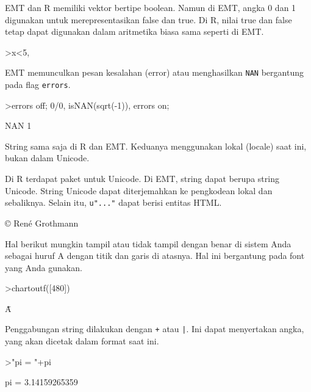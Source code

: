 \documentclass[a4paper,11pt,oneside,enabledeprecatedfontcommands]{scrbook}
\newenvironment{eulernotebook}{}{}
\newenvironment{eulercomment}{\par\medskip\noindent}{\par\medskip}
\begin{document}
\begin{eulernotebook}
\begin{eulercomment}
			EMT dan R memiliki vektor bertipe boolean. Namun di EMT, angka 0 dan 1 digunakan untuk
			merepresentasikan false dan true. Di R, nilai true dan false tetap dapat digunakan dalam aritmetika
			biasa sama seperti di EMT.
		\end{eulercomment}
		\begin{eulerprompt}
			>x<5, %
		\end{eulerprompt}
		\begin{euleroutput}
			[0,  0,  1,  0,  0]
			[0,  0,  3.1,  0,  0]
		\end{euleroutput}
		\begin{eulercomment}
			EMT memunculkan pesan kesalahan (error) atau menghasilkan \texttt{NAN} bergantung pada flag \texttt{errors}.
		\end{eulercomment}
		\begin{eulerprompt}
			>errors off; 0/0, isNAN(sqrt(-1)), errors on;
		\end{eulerprompt}
		\begin{euleroutput}
			NAN
			1
		\end{euleroutput}
		\begin{eulercomment}
			String sama saja di R dan EMT. Keduanya menggunakan lokal (locale) saat ini, bukan dalam Unicode.
			
			Di R terdapat paket untuk Unicode. Di EMT, string dapat berupa string Unicode. String Unicode dapat
			diterjemahkan ke pengkodean lokal dan sebaliknya. Selain itu, \texttt{u"..."} dapat berisi entitas HTML.
		\end{eulercomment}
		\begin{euleroutput}
			© René Grothmann
		\end{euleroutput}
		\begin{eulercomment}
			Hal berikut mungkin tampil atau tidak tampil dengan benar di sistem Anda sebagai huruf A dengan titik
			dan garis di atasnya. Hal ini bergantung pada font yang Anda gunakan.
		\end{eulercomment}
		\begin{eulerprompt}
			>chartoutf([480])
		\end{eulerprompt}
		\begin{euleroutput}
			Ǡ
		\end{euleroutput}
		\begin{eulercomment}
			Penggabungan string dilakukan dengan \texttt{+} atau \texttt{|}. Ini dapat menyertakan angka, yang akan dicetak
			dalam format saat ini.
		\end{eulercomment}
		\begin{eulerprompt}
			>"pi = "+pi
		\end{eulerprompt}
		\begin{euleroutput}
			pi = 3.14159265359
		\end{euleroutput}
		

\end{eulernotebook}
\end{document}
